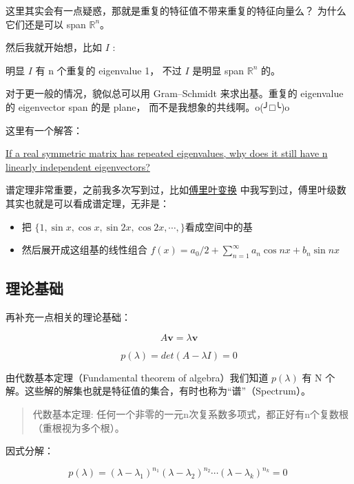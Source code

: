 \documentclass[
]{book}
\providecommand{\tightlist}{%
  \setlength{\itemsep}{0pt}\setlength{\parskip}{0pt}}
\begin{document}
这里其实会有一点疑惑，那就是重复的特征值不带来重复的特征向量么？ 为什么它们还是可以 span \(\mathbb{R}^n\)。

然后我就开始想，比如 \(I\) :

明显 \(I\) 有 n 个重复的 eigenvalue 1， 不过 \(I\) 是明显 span \(\mathbb{R}^n\) 的。

对于更一般的情况，貌似总可以用 Gram--Schmidt 来求出基。重复的 eigenvalue 的 eigenvector span 的是 plane， 而不是我想象的共线啊。o(╯□╰)o

这里有一个解答：

\href{https://math.stackexchange.com/questions/1517539/if-a-real-symmetric-matrix-has-repeated-eigenvalues-why-does-it-still-have-n-li/1517545\#1517545}{If a real symmetric matrix has repeated eigenvalues, why does it still have n linearly independent eigenvectors?}

谱定理非常重要，之前我多次写到过，比如\href{https://zhuanlan.zhihu.com/p/104079068}{傅里叶变换} 中我写到过，傅里叶级数其实也就是可以看成谱定理，无非是：

\begin{itemize}
\tightlist
\item
  把 \(\{1, \sin x, \cos x, \sin 2x, \cos2x, \cdots, \}\)看成空间中的基
\item
  然后展开成这组基的线性组合 \(f(x) = a_0/2 + \sum_{n = 1}^ \infty a_n \cos nx + b_n \sin nx\)
\end{itemize}

\hypertarget{ux7406ux8bbaux57faux7840}{%
\subsection{理论基础}\label{ux7406ux8bbaux57faux7840}}

再补充一点相关的理论基础：

\[A\mathbf{v} = \lambda \mathbf{v}\]

\[p(\lambda) = det(A - \lambda I) = 0\]

由代数基本定理（Fundamental theorem of algebra）我们知道 \(p(\lambda)\) 有 N 个解。这些解的解集也就是特征值的集合，有时也称为``谱''（Spectrum）。

\begin{quote}
代数基本定理: 任何一个非零的一元n次复系数多项式，都正好有n个复数根（重根视为多个根）。
\end{quote}

因式分解：

\[p\left(\lambda\right)= (\lambda-\lambda_1)^{n_1}(\lambda-\lambda_2)^{n_2}\cdots(\lambda-\lambda_k)^{n_k} = 0 \!\ \]
\end{document}
